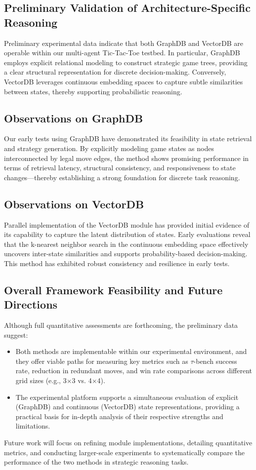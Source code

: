 \documentclass{article}
\begin{document}
\subsection{Preliminary Validation of Architecture-Specific Reasoning}
Preliminary experimental data indicate that both GraphDB and VectorDB are operable within our multi-agent Tic-Tac-Toe testbed. In particular, GraphDB employs explicit relational modeling to construct strategic game trees, providing a clear structural representation for discrete decision-making. Conversely, VectorDB leverages continuous embedding spaces to capture subtle similarities between states, thereby supporting probabilistic reasoning.

\subsection{Observations on GraphDB}
Our early tests using GraphDB have demonstrated its feasibility in state retrieval and strategy generation. By explicitly modeling game states as nodes interconnected by legal move edges, the method shows promising performance in terms of retrieval latency, structural consistency, and responsiveness to state changes—thereby establishing a strong foundation for discrete task reasoning.

\subsection{Observations on VectorDB}
Parallel implementation of the VectorDB module has provided initial evidence of its capability to capture the latent distribution of states. Early evaluations reveal that the k-nearest neighbor search in the continuous embedding space effectively uncovers inter-state similarities and supports probability-based decision-making. This method has exhibited robust consistency and resilience in early tests.

\subsection{Overall Framework Feasibility and Future Directions}
Although full quantitative assessments are forthcoming, the preliminary data suggest:
\begin{itemize}
    \item Both methods are implementable within our experimental environment, and they offer viable paths for measuring key metrics such as $\tau$-bench success rate, reduction in redundant moves, and win rate comparisons across different grid sizes (e.g., 3$\times$3 vs. 4$\times$4).
    \item The experimental platform supports a simultaneous evaluation of explicit (GraphDB) and continuous (VectorDB) state representations, providing a practical basis for in-depth analysis of their respective strengths and limitations.
\end{itemize}
Future work will focus on refining module implementations, detailing quantitative metrics, and conducting larger-scale experiments to systematically compare the performance of the two methods in strategic reasoning tasks.
\end{document}
